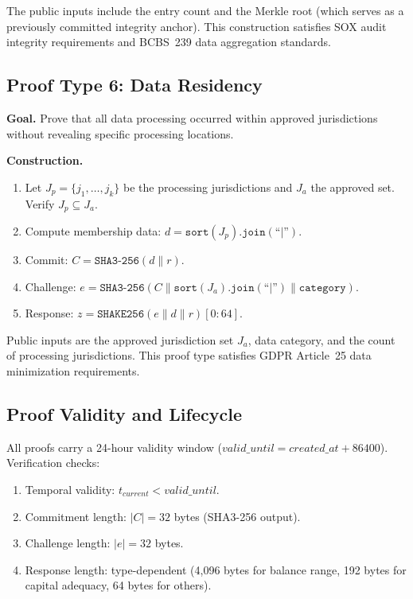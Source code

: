 \documentclass[conference,10pt]{IEEEtran}
\newcommand{\SHAKE}{\texttt{SHAKE256}}
\newcommand{\SHA}{\texttt{SHA3-256}}
\begin{document}
The public inputs include the entry count and the Merkle root (which serves as a previously committed integrity anchor). This construction satisfies SOX audit integrity requirements and BCBS~239 data aggregation standards.

\subsection{Proof Type 6: Data Residency}

\textbf{Goal.} Prove that all data processing occurred within approved jurisdictions without revealing specific processing locations.

\textbf{Construction.}
\begin{enumerate}
\item Let $J_p = \{j_1, \ldots, j_k\}$ be the processing jurisdictions and $J_a$ the approved set. Verify $J_p \subseteq J_a$.
\item Compute membership data: $d = \texttt{sort}(J_p).\texttt{join}(\texttt{``|''})$.
\item Commit: $C = \SHA(d \| r)$.
\item Challenge: $e = \SHA(C \| \texttt{sort}(J_a).\texttt{join}(\texttt{``|''}) \| \texttt{category})$.
\item Response: $z = \SHAKE(e \| d \| r)[0{:}64]$.
\end{enumerate}

Public inputs are the approved jurisdiction set $J_a$, data category, and the count of processing jurisdictions. This proof type satisfies GDPR Article~25 data minimization requirements.

\subsection{Proof Validity and Lifecycle}

All proofs carry a 24-hour validity window ($valid\_until = created\_at + 86400$). Verification checks:
\begin{enumerate}
\item Temporal validity: $t_{current} < valid\_until$.
\item Commitment length: $|C| = 32$ bytes (SHA3-256 output).
\item Challenge length: $|e| = 32$ bytes.
\item Response length: type-dependent (4,096 bytes for balance range, 192 bytes for capital adequacy, 64 bytes for others).
\end{enumerate}
\end{document}
